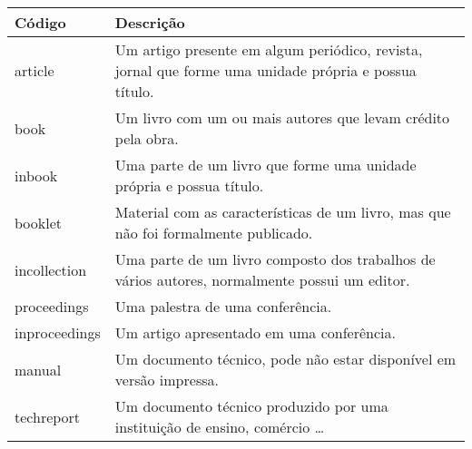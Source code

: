 % 
% 
% 
% 
% 
\begin{tabular}{lp{}}
    \hline
    Código & Descrição \\ \hline
    \textsf{article} & Um artigo presente em algum periódico, revista, jornal que forme uma unidade própria e possua título. \\
    \textsf{book} & Um livro com um ou mais autores que levam crédito pela obra. \\
    \textsf{inbook} & Uma parte de um livro que forme uma unidade própria e possua título. \\
    \textsf{booklet} & Material com as características de um livro, mas que não foi formalmente publicado. \\
    \textsf{incollection} & Uma parte de um livro composto dos trabalhos de vários autores, normalmente possui um editor. \\
    \textsf{proceedings} & Uma palestra de uma conferência. \\
    \textsf{inproceedings} & Um artigo apresentado em uma conferência. \\
    \textsf{manual} & Um documento técnico, pode não estar disponível em versão impressa. \\
    \textsf{techreport} & Um documento técnico produzido por uma instituição de ensino, comércio \dots \\

\end{tabular}

